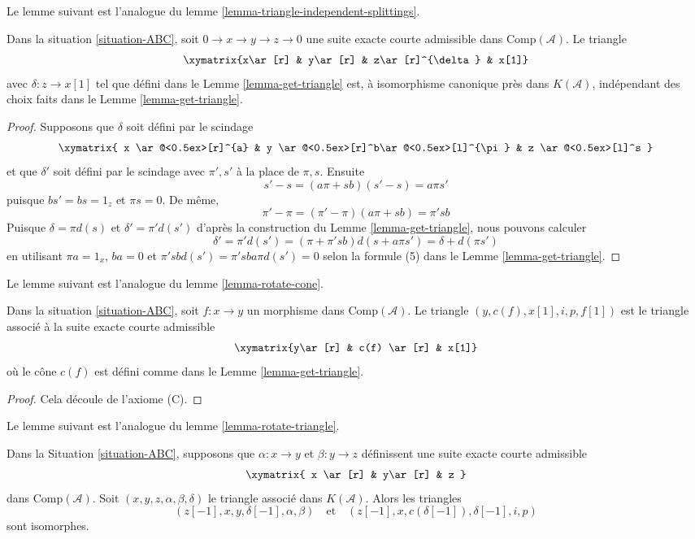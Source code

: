 \noindent
Le lemme suivant est l'analogue du lemme
\ref{lemma-triangle-independent-splittings}.

\begin{lemma}
\label{lemma-analogue-triangle-independent-splittings}
Dans la situation \ref{situation-ABC}, soit $0 \to x \to y \to z \to 0$ une suite
exacte courte admissible dans $\text{Comp}(\mathcal{A})$. Le triangle
$$
\xymatrix{x\ar[r] & y\ar[r] & z\ar[r]^{\delta} & x[1]}
$$
avec $\delta : z \to x[1]$ tel que défini dans le Lemme \ref{lemma-get-triangle}
est, à isomorphisme canonique près dans $K(\mathcal{A})$, indépendant des choix
faits dans le Lemme \ref{lemma-get-triangle}.
\end{lemma}

\begin{proof}
Supposons que $\delta$ soit défini par le scindage
$$
\xymatrix{
x \ar@<0.5ex>[r]^{a} &
y \ar@<0.5ex>[r]^b\ar@<0.5ex>[l]^{\pi} &
z \ar@<0.5ex>[l]^s
}
$$
et que $\delta'$ soit défini par le scindage avec $\pi',s'$ à la place de $\pi,s$.
Ensuite
$$
s'-s = (a\pi + sb)(s'-s) = a\pi s'
$$
puisque $bs' = bs = 1_z$ et $\pi s = 0$. De même,
$$
\pi' - \pi = (\pi' - \pi)(a\pi + sb) = \pi'sb
$$
Puisque $\delta = \pi d(s)$ et $\delta' = \pi'd(s')$ d'après la construction du Lemme
\ref{lemma-get-triangle}, nous pouvons calculer
$$
\delta' = \pi'd(s') = (\pi + \pi'sb)d(s + a\pi s') = \delta + d(\pi s')
$$
en utilisant $\pi a = 1_x$, $ba = 0$ et $\pi'sbd(s') = \pi'sba\pi d(s') = 0$ selon
la formule (5) dans le Lemme \ref{lemma-get-triangle}.
\end{proof}

\noindent
Le lemme suivant est l'analogue du lemme \ref{lemma-rotate-cone}.

\begin{lemma}
\label{lemma-restate-axiom-c}
Dans la situation \ref{situation-ABC}, soit $f: x \to y$ un morphisme dans
$\text{Comp}(\mathcal{A})$. Le triangle $(y, c(f), x[1], i, p, f[1])$ est le
triangle associé à la suite exacte courte admissible
$$
\xymatrix{y\ar[r] & c(f) \ar[r] & x[1]}
$$
où le cône $c(f)$ est défini comme dans le Lemme \ref{lemma-get-triangle}.
\end{lemma}

\begin{proof}
Cela découle de l'axiome (C).
\end{proof}

\noindent
Le lemme suivant est l'analogue du lemme \ref{lemma-rotate-triangle}.

\begin{lemma}
\label{lemma-cone-rotate-isom}
Dans la Situation \ref{situation-ABC}, supposons que $\alpha : x \to y$ et $\beta : y \to z$
définissent une suite exacte courte admissible
$$
\xymatrix{
x \ar[r] &
y\ar[r] &
z
}
$$
dans $\text{Comp}(\mathcal{A})$. Soit $(x, y, z, \alpha, \beta, \delta)$ le
triangle associé dans $K(\mathcal{A})$. Alors les triangles
$$
(z[-1], x, y, \delta[-1], \alpha, \beta)
\quad\text{et}\quad
(z[-1], x, c(\delta[-1]), \delta[-1], i, p)
$$
sont isomorphes.
\end{lemma}

